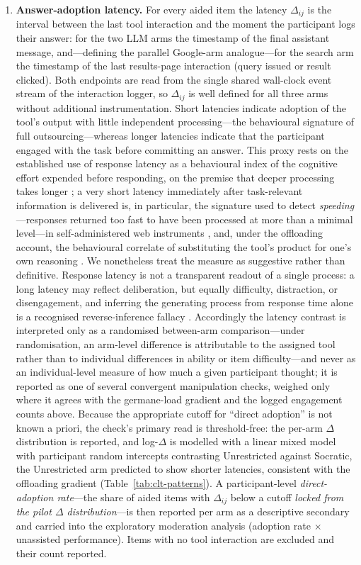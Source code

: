 \begin{enumerate}
    \item \textbf{Answer-adoption latency.} For every aided item the latency $\Delta_{ij}$ is the interval between the last tool interaction and the moment the participant logs their answer: for the two LLM arms the timestamp of the final assistant message, and---defining the parallel Google-arm analogue---for the search arm the timestamp of the last results-page interaction (query issued or result clicked). Both endpoints are read from the single shared wall-clock event stream of the interaction logger, so $\Delta_{ij}$ is well defined for all three arms without additional instrumentation.
    Short latencies indicate adoption of the tool's output with little independent processing---the behavioural signature of full outsourcing---whereas longer latencies indicate that the participant engaged with the task before committing an answer. This proxy rests on the established use of response latency as a behavioural index of the cognitive effort expended before responding, on the premise that deeper processing takes longer \parencite{callegaro2009,fazio1990}; a very short latency immediately after task-relevant information is delivered is, in particular, the signature used to detect \emph{speeding}---responses returned too fast to have been processed at more than a minimal level---in self-administered web instruments \parencite{zhang2014}, and, under the offloading account, the behavioural correlate of substituting the tool's product for one's own reasoning \parencite{risko2016,kirschner2026}. We nonetheless treat the measure as suggestive rather than definitive. Response latency is not a transparent readout of a single process: a long latency may reflect deliberation, but equally difficulty, distraction, or disengagement, and inferring the generating process from response time alone is a recognised reverse-inference fallacy \parencite{krajbich2015}. Accordingly the latency contrast is interpreted only as a randomised between-arm comparison---under randomisation, an arm-level difference is attributable to the assigned tool rather than to individual differences in ability or item difficulty---and never as an individual-level measure of how much a given participant thought; it is reported as one of several convergent manipulation checks, weighed only where it agrees with the germane-load gradient and the logged engagement counts above. Because the appropriate cutoff for ``direct adoption'' is not known a priori, the check's primary read is threshold-free: the per-arm $\Delta$ distribution is reported, and log-$\Delta$ is modelled with a linear mixed model with participant random intercepts contrasting Unrestricted against Socratic, the Unrestricted arm predicted to show shorter latencies, consistent with the offloading gradient (Table~\ref{tab:clt-patterns}). A participant-level \emph{direct-adoption rate}---the share of aided items with $\Delta_{ij}$ below a cutoff \emph{locked from the pilot $\Delta$ distribution}---is then reported per arm as a descriptive secondary and carried into the exploratory moderation analysis (adoption rate $\times$ unassisted performance). Items with no tool interaction are excluded and their count reported. %
\end{enumerate}
